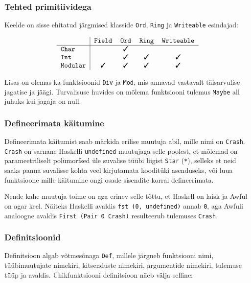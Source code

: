 \documentclass[12pt]{article}
\def\linnuke{\ding{51}}
\begin{document}
      \subsubsection{Tehted primitiividega}
        Keelde on sisse ehitatud järgmised klasside \verb!Ord!, \verb!Ring! ja \verb!Writeable! esindajad:

        \begin{equation*}
          \begin{tabular}{l|cccc}
                           & \verb!Field! & \verb!Ord! & \verb!Ring! & \verb!Writeable! \\\hline
            \verb!Char!    &              & \linnuke   &             &                  \\
            \verb!Int!     &              & \linnuke   & \linnuke    & \linnuke         \\
            \verb!Modular! & \linnuke     & \linnuke   & \linnuke    & \linnuke
          \end{tabular}
        \end{equation*}

        Lisas on olemas ka funktsioonid \verb!Div! ja \verb!Mod!, mis annavad vastavalt täisarvulise jagatise ja jäägi. Turvalisuse huvides on mõlema funktsiooni tulemus \verb!Maybe! all juhuks kui jagaja on null.
      \subsubsection{Defineerimata käitumine}
        Defineerimata käitumist saab märkida erilise muutuja abil, mille nimi on \verb!Crash!. \verb!Crash! on sarnane Haskelli \verb!undefined! muutujaga selle poolest, et mõlemad on parameetriliselt polümorfsed üle suvalise tüübi liigist \verb!Star! (\verb!*!), selleks et neid saaks panna suvalisse kohta veel kirjutamata kooditüki asenduseks, või luua funktsioone mille käitumine ongi osade sisendite korral defineerimata.

        Nende kahe muutuja toime on aga erinev selle tõttu, et Haskell on laisk ja Awful on agar keel. Näiteks Haskelli avaldis \verb!fst (0, undefined)! annab \verb!0!, aga Awfuli analoogne avaldis \verb!First (Pair 0 Crash)! resulteerub tulemuses \verb!Crash!.
      \subsubsection{Definitsioonid}
        Definitsioon algab võtmesõnaga \verb!Def!, millele järgneb funktsiooni nimi, tüübimuutujate nimekiri, kitsenduste nimekiri, argumentide nimekiri, tulemuse tüüp ja avaldis. Ühikfunktsiooni definitsioon näeb välja selline:
\end{document}
